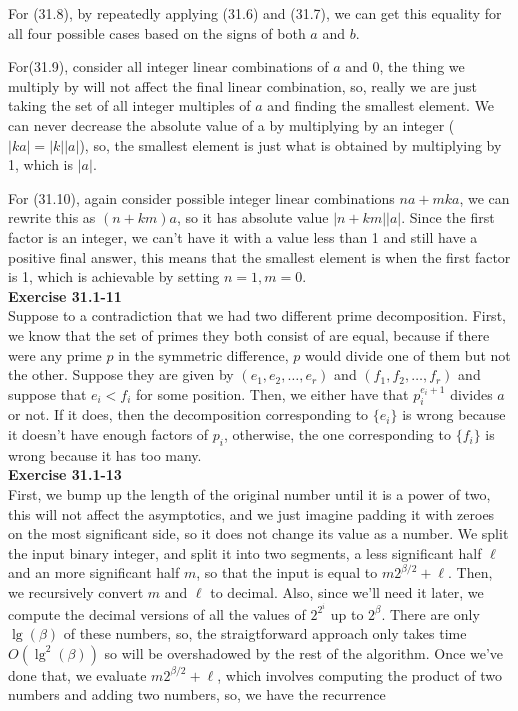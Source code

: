 \documentclass{article}
\begin{document}
For (31.8), by repeatedly applying (31.6) and (31.7), we can get this equality for all four possible cases based on the signs of both $a$ and $b$.

For(31.9), consider all integer linear combinations of $a$ and $0$, the thing we multiply  by will not affect the final linear combination, so, really we are just taking the set of all integer multiples of $a$ and finding the smallest element. We can never decrease the absolute value of a by multiplying by an integer ($|ka| = |k||a|$), so, the smallest element is just what is obtained by multiplying by 1, which is $|a|$.

For (31.10), again consider possible integer linear combinations $na + mka$, we can rewrite this as $(n+km)a$, so it has absolute value $|n+km||a|$. Since the first factor is an integer, we can't have it with a value less than 1 and still have a positive final answer, this means that the smallest element is when the first factor is 1, which is achievable by setting $n=1,m=0$.\\



\noindent\textbf{Exercise 31.1-11}\\
Suppose to a contradiction that we had two different prime decomposition. First, we know that the set of primes they both consist of are equal, because if there were any prime $p$ in the symmetric difference, $p$ would divide one of them but not the other. Suppose they are given by $(e_1,e_2, \ldots,e_r)$ and $(f_1,f_2,\ldots,f_r)$ and suppose that $e_i < f_i$ for some position. Then, we either have that $p_i^{e_i+1}$ divides $a$ or not. If it does, then the decomposition corresponding to $\{e_i\}$ is wrong because it doesn't have enough factors of $p_i$, otherwise, the one corresponding to $\{f_i\}$ is wrong because it has too many.\\



\noindent\textbf{Exercise 31.1-13}\\
First, we bump up the length of the original number until it is a power of two, this will not affect the asymptotics, and we just imagine padding it with zeroes on the most significant side, so it does not change its value as a number. We split the input binary integer, and split it into two segments, a less significant half $\ell$ and an more significant half $m$, so that the input is equal to $m2^{\beta/2} + \ell$. Then, we recursively convert $m$ and $\ell$ to decimal. Also, since we'll need it later, we compute the decimal versions of all the values of $2^{2^i}$ up to $2^{\beta}$. There are only $\lg(\beta)$ of these numbers, so, the straigtforward approach only takes time $O(\lg^2(\beta))$ so will be overshadowed by the rest of the algorithm. Once we've done that, we evaluate $m2^{\beta/2} + \ell$, which involves computing the product of two numbers and adding two numbers, so, we have the recurrence
\end{document}
